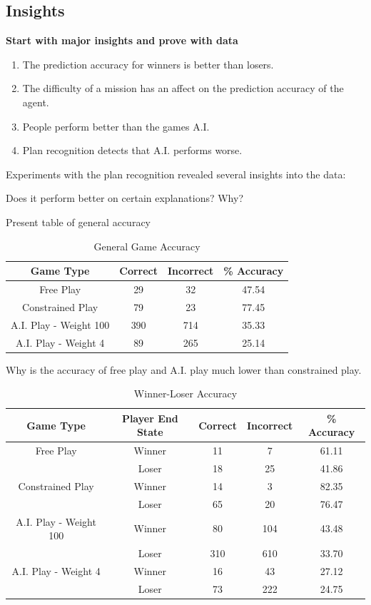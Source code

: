 \documentclass[parskip]{cs4rep}
\begin{document}
\subsection{Insights}

\textbf{Start with major insights and prove with data}

\begin{enumerate}
\item
The prediction accuracy for winners is better than losers.
\item
The difficulty of a mission has an affect on the prediction accuracy of the agent.
\item
People perform better than the games A.I.
\item
Plan recognition detects that A.I. performs worse. 
\end{enumerate}

Experiments with the plan recognition revealed several insights into the data:

Does it perform better on certain explanations? Why?

Present table of general accuracy

\begin{table}[ht]
\centering
\begin{tabular}{|c|c|c|c|}
\hline 
\textbf{Game Type} & \textbf{Correct} & \textbf{Incorrect} & \textbf{\% Accuracy} \\ 
\hline 
Free Play & 29 & 32 & 47.54 \\ 
\hline 
Constrained Play & 79 & 23 & 77.45 \\ 
\hline 
A.I. Play - Weight 100 & 390 & 714 & 35.33 \\ 
\hline 
A.I. Play - Weight 4 & 89 & 265 & 25.14 \\
\hline 
\end{tabular}
\caption{General Game Accuracy}
\label{table:general-game-accuracy}
\end{table}

Why is the accuracy of free play and A.I. play much lower than constrained play.

\begin{table}[ht]
\centering
\begin{tabular}{|c|c|c|c|c|}
\hline 
\textbf{Game Type} & \textbf{Player End State} & \textbf{Correct} & \textbf{Incorrect} & \textbf{\% Accuracy} \\ 
\hline 
Free Play & Winner & 11 & 7 & 61.11 \\ 
& Loser & 18 & 25 & 41.86 \\ 
\hline 
Constrained Play & Winner & 14 & 3 & 82.35 \\ 
& Loser & 65 & 20 & 76.47 \\ 
\hline
A.I. Play - Weight 100 & Winner & 80 & 104 & 43.48 \\ 
& Loser & 310 & 610 & 33.70 \\  
\hline
A.I. Play - Weight 4 & Winner & 16 & 43 & 27.12 \\ 
& Loser & 73 & 222 & 24.75 \\ 
\hline
\end{tabular}
\caption{Winner-Loser Accuracy}
\label{table:winner-loser-accuracy}
\end{table}
\end{document}
